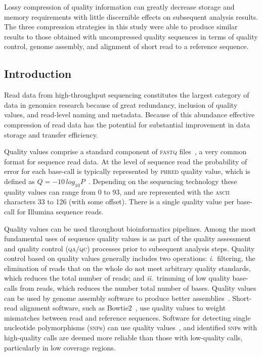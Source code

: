 Lossy compression of quality information can greatly decrease storage
and memory requirements with little discernible effects on subsequent
analysis results. The three compression strategies in this study were
able to produce similar results to those obtained with uncompressed
quality sequences in terms of quality control, genome assembly, and
alignment of short read to a reference sequence.

\subsection{Introduction}

Read data from high-throughput sequencing constitutes the largest
category of data in genomics research because of great redundancy,
inclusion of quality values, and read-level naming and
metadata. Because of this abundance effective compression of read data
has the potential for substantial improvement in data storage and
transfer efficiency.

Quality values comprise a standard component of \textsc{fastq}
files~\cite{Cock:2010ve}, a very common format for sequence read
data. At the level of sequence read the probability of error for each
base-call is typically represented by \textsc{phred} quality value,
which is defined as $Q =
-10\,log_{10}P$~\cite{Ewing:1998ly}. Depending on the sequencing
technology these quality values can range from 0 to 93, and are
represented with the \textsc{ascii} characters 33 to 126 (with some
offset). There is a single quality value per base-call for Illumina
sequence reads.

Quality values can be used throughout bioinformatics pipelines. Among
the most fundamental uses of sequence quality values is as part of the
quality assessment and quality control (\textsc{qa/qc}) processes
prior to subsequent analysis steps. Quality control based on quality
values generally includes two operations: \textit{i}.~filtering, the
elimination of reads that on the whole do not meet arbitrary quality
standards, which reduces the total number of reads; and
\textit{ii}.~trimming of low quality base-calls from reads, which
reduces the number total number of bases. Quality values can be used
by genome assembly software to produce better
assemblies~\cite{Bryant:2009uq,Gnerre:2011kx}. Short-read
alignment software, such as Bowtie2~\cite{langmead2012fast}, use
quality values to weight mismatches between read and reference
sequences. Software for detecting single nucleotide polymorphisms
(\textsc{snp}s) can use quality values~\cite{McKenna:2010bh},
and identified \textsc{snp}s with high-quality calls are deemed more
reliable than those with low-quality calls, particularly in low
coverage regions.


